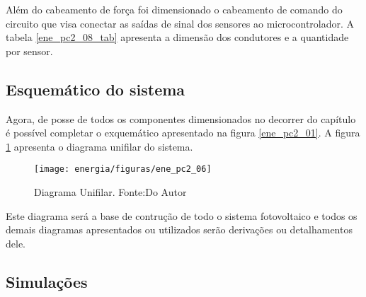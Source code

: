 Além do cabeamento de força foi dimensionado o cabeamento de comando do circuito que visa conectar as saídas de sinal dos sensores ao microcontrolador. A tabela \ref{ene_pc2_08_tab} apresenta a dimensão dos condutores e a quantidade por sensor.

\begin{table}[H]
\caption{Quantidade de condutores de comando por sensor}
\label{ene_pc2_08_tab}
\end{table}

\subsection{Esquemático do sistema}

Agora, de posse de todos os componentes dimensionados no decorrer do capítulo é possível completar o exquemático apresentado na figura \ref{ene_pc2_01}. A figura \ref{ene_pc2_06} apresenta o diagrama unifilar do sistema.

\begin{figure}[H]
		\centering
		\texttt{[image: energia/figuras/ene\_pc2\_06]}
		\caption{Diagrama Unifilar. Fonte:Do Autor}
		\label{ene_pc2_06}
\end{figure}

Este diagrama será a base de contrução de todo o sistema fotovoltaico e todos os demais diagramas apresentados ou utilizados serão derivações ou detalhamentos dele.

\subsection{Simulações}

